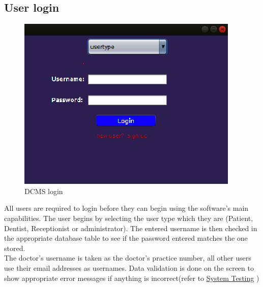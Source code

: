 \documentclass[11 pt]{article}
\begin{document}
\subsection{User login}
\begin{figure}[h]
\centering
\includegraphics[width=0.7\linewidth]{login.png}
\caption{DCMS login}
\label{fig:login}
\end{figure}
All users are required to login before they can begin using the software's main capabilities. The user begins by selecting the user type which they are (Patient, Dentist, Receptionist or administrator). The entered username is then checked in the appropriate database table to see if the password entered matches the one stored. \\
The doctor's username is taken as the doctor's practice number, all other users use their email addresses as usernames.
Data validation is done on the screen to show appropriate error messages if anything is incorrect(refer to
\hyperref[sec:system_testing]{System Testing} )
\end{document}
